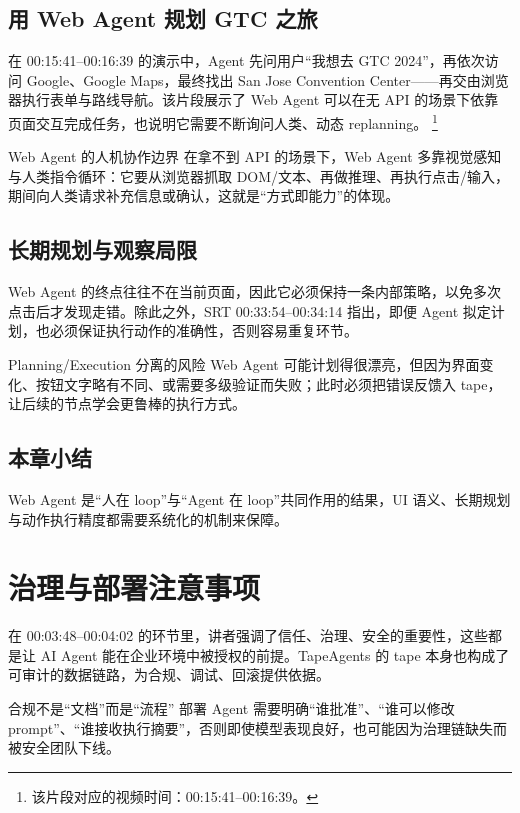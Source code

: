 \documentclass[a4paper]{article}
\begin{document}
\subsection{用 Web Agent 规划 GTC 之旅}
在 00:15:41--00:16:39 的演示中，Agent 先问用户“我想去 GTC 2024”，再依次访问 Google、Google Maps，最终找出 San Jose Convention Center——再交由浏览器执行表单与路线导航。该片段展示了 Web Agent 可以在无 API 的场景下依靠页面交互完成任务，也说明它需要不断询问人类、动态 replanning。
\footnote{该片段对应的视频时间：00:15:41--00:16:39。}

\begin{importantbox}{Web Agent 的人机协作边界}
在拿不到 API 的场景下，Web Agent 多靠视觉感知与人类指令循环：它要从浏览器抓取 DOM/文本、再做推理、再执行点击/输入，期间向人类请求补充信息或确认，这就是“方式即能力”的体现。
\end{importantbox}

\subsection{长期规划与观察局限}
Web Agent 的终点往往不在当前页面，因此它必须保持一条内部策略，以免多次点击后才发现走错。除此之外，SRT 00:33:54--00:34:14 指出，即便 Agent 拟定计划，也必须保证执行动作的准确性，否则容易重复环节。

\begin{warningbox}{Planning/Execution 分离的风险}
Web Agent 可能计划得很漂亮，但因为界面变化、按钮文字略有不同、或需要多级验证而失败；此时必须把错误反馈入 tape，让后续的节点学会更鲁棒的执行方式。
\end{warningbox}

\subsection{本章小结}
Web Agent 是“人在 loop”与“Agent 在 loop”共同作用的结果，UI 语义、长期规划与动作执行精度都需要系统化的机制来保障。

\section{治理与部署注意事项}
在 00:03:48--00:04:02 的环节里，讲者强调了信任、治理、安全的重要性，这些都是让 AI Agent 能在企业环境中被授权的前提。TapeAgents 的 tape 本身也构成了可审计的数据链路，为合规、调试、回滚提供依据。

\begin{warningbox}{合规不是“文档”而是“流程”}
部署 Agent 需要明确“谁批准”、“谁可以修改 prompt”、“谁接收执行摘要”，否则即使模型表现良好，也可能因为治理链缺失而被安全团队下线。
\end{warningbox}
\end{document}
